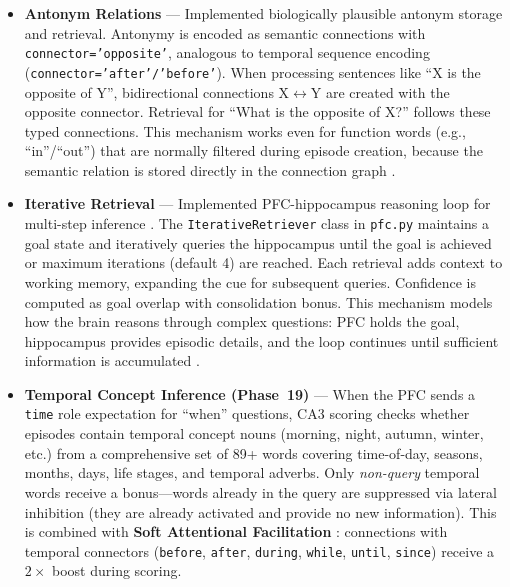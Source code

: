 \documentclass[11pt]{article}
\begin{document}
\begin{itemize}
      instead of ``february''. Now filters out words already in the question, returning only new
      information \citep{eichenbaum2014time}.
\item \textbf{Antonym Relations} --- Implemented biologically plausible antonym storage and retrieval.
      Antonymy is encoded as semantic connections with \texttt{connector='opposite'}, analogous to temporal
      sequence encoding (\texttt{connector='after'/'before'}). When processing sentences like ``X is the
      opposite of Y'', bidirectional connections X$\leftrightarrow$Y are created with the opposite connector.
      Retrieval for ``What is the opposite of X?'' follows these typed connections. This mechanism works
      even for function words (e.g., ``in''/``out'') that are normally filtered during episode creation,
      because the semantic relation is stored directly in the connection graph \citep{murphy2003semantic}.
\item \textbf{Iterative Retrieval} --- Implemented PFC-hippocampus reasoning loop for multi-step
      inference \citep{preston2013interplay,eichenbaum2017prefrontal}. The \texttt{IterativeRetriever} class
      in \texttt{pfc.py} maintains a goal state and iteratively queries the hippocampus until the goal is
      achieved or maximum iterations (default 4) are reached. Each retrieval adds context to working memory,
      expanding the cue for subsequent queries. Confidence is computed as goal overlap with consolidation bonus.
      This mechanism models how the brain reasons through complex questions: PFC holds the goal, hippocampus
      provides episodic details, and the loop continues until sufficient information is accumulated
      \citep{miller2001integrative}.
\item \textbf{Temporal Concept Inference (Phase~19)} --- When the PFC sends a \texttt{time} role
      expectation for ``when'' questions, CA3 scoring checks whether episodes contain temporal
      concept nouns (morning, night, autumn, winter, etc.) from a comprehensive set of 89+ words
      covering time-of-day, seasons, months, days, life stages, and temporal adverbs. Only
      \emph{non-query} temporal words receive a bonus---words already in the query are suppressed
      via lateral inhibition (they are already activated and provide no new information).
      This is combined with \textbf{Soft Attentional Facilitation} \citep{miller2001integrative}:
      connections with temporal connectors (\texttt{before}, \texttt{after}, \texttt{during},
      \texttt{while}, \texttt{until}, \texttt{since}) receive a $2\times$ boost during scoring.

\end{itemize}
\end{document}
